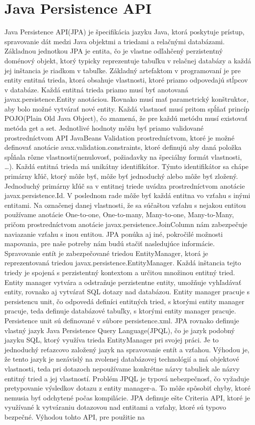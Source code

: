 \section{Java Persistence API}
Java Persistence API(JPA) je špecifikácia jazyku Java, ktorá poskytuje prístup, spravovanie dát medzi Java objektmi a triedami a relačnými databázami. Základnou jednotkou JPA je entita, čo je vlastne odľahčený perzistentný doménový objekt, ktorý typicky reprezentuje tabuľku v relačnej databázy a každá jej inštancia je riadkom v  tabuľke. Základný artefaktom v programovaní je pre entity entitná trieda, ktorá obsahuje vlastnosti, ktoré priamo odpovedajú stĺpcov v databáze. Každá entitná trieda priamo musí byť anotovaná javax.persistence.Entity anotáciou. Rovnako musí mať parametrický konštruktor, aby bolo možné vytvárať nové entity. Každá vlastnosť musí pritom spĺňať princíp POJO(Plain Old Java Object), čo znamená, že pre každú metódu musí existovať metóda get a set. Jednotlivé hodnoty môžu byť priamo validované prostredníctvom API JavaBeans Validation prostredníctvom, ktoré je možné definovať anotácie avax.validation.constraints, ktoré definujú aby daná položka spĺňala rôzne vlastnosti(nenulovosť, požiadavky na špeciálny formát vlastnosti, \ldots). Každá entitná trieda má unikátny identifikátor. Týmto identifikátor sa chápe primárny kľúč, ktorý môže byť, môže byť jednoduchý alebo môže byť zložený. Jednoduchý primárny kľúč sa v entitnej triede uvádza prostredníctvom anotácie javax.persistence.Id. V poslednom rade môže byť každá entitna vo vzťahu s inými entitami. Na označenej danej vlastnosti, že sa súčaštou vzťahu s nejakou entitou používame anotácie One-to-one, One-to-many, Many-to-one, Many-to-Many, pričom prostredníctvom anotácie javax.persistence.JoinColumn nám zabezpečuje naviazanie vzťahu s inou entitou. JPA ponúka aj iné, pokročilé možnosti mapovania, pre naše potreby nám budú stačiť nasledujúce informácie. Spravovanie entít je zabezpečované triedou EntityManager, ktorá je reprezentovaná triedou javax.persistence.EntityManager. Každá inštancia tejto triedy je spojená s perzistentný kontextom a určitou množinou entitný tried. Entity manager vytvára a odstraňuje perzistentne entity, umožňuje vyhľadávať entity, rovnako aj vytvárať SQL dotazy nad databázou. Entity manager pracuje s persistencu unit, čo odpovedá definíci entitných tried, s ktorými entity manager pracuje, teda definuje databázové tabuľky, s ktorými entity manager pracuje. Persistence unit sú definované v súbore persistence.xml. JPA rovnako definuje vlastný jazyk Java Persistence Query Language(JPQL), čo je jazyk podobný jazyku SQL, ktorý využíva trieda EntityManager pri svojej práci. Je to jednoduchý reťazcovo založený jazyk na spravovanie entít a vzťahou. Výhodou je, že tento jazyk je nezávislý na zvolenej databázovej technológií a má objektové vlastnosti, teda pri dotazoch nepoužívame konkrétne názvy tabuliek ale názvy entitný tried a jej vlastností. Problém JPQL je typová nebezpečnosť, čo vyžaduje pretypovanie výsledkov dotazu z entity manager-a. To môže spôsobiť chyby, ktoré nemusia byť odchytené počas kompilácie. JPA definuje ešte Criteria API, ktoré je využívané k vytváraniu dotazovou nad entitami a vzťahy, ktoré sú typovo bezpečné. Výhodou tohto API, pre použitie na 
